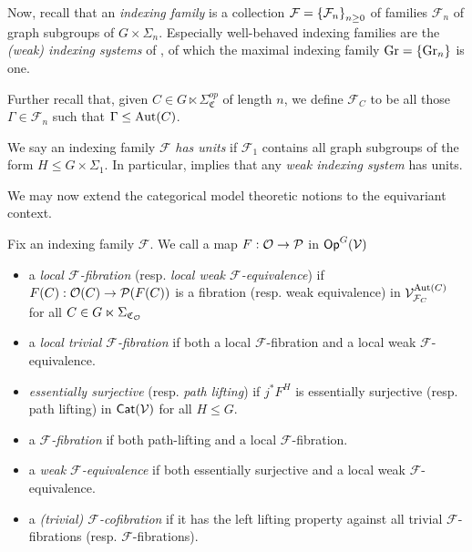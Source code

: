 \documentclass[a4paper,10pt
,draft
]{article}%
\renewcommand{\F}{\mathcal F}
\renewcommand{\1}{\eta}%
\newcommand{\SC}{\Sigma_{\mathfrak C}}
\begin{document}
Now, recall that an \textit{indexing family} is a collection $\F = \set{\F_n}_{n \geq 0}$ of families $\F_n$ of graph subgroups of $G \times \Sigma_n$.
Especially well-behaved indexing families are the \textit{(weak) indexing systems} of \cite{BP_geo},
of which the maximal indexing family $\mathrm{Gr} = \left\{\mathrm{Gr}_n\right\}$ is one.

Further recall that, given $C \in G \ltimes \SC^{op}$ of length $n$, we define $\F_C$ to be all those $\Gamma \in \F_n$ such that $\Gamma \leq \operatorname{Aut}(C)$.

\begin{definition}
      We say an indexing family $\F$ \textit{has units} if
      $\F_1$ contains all graph subgroups of the form $H \leq G \times \Sigma_1$.
      In particular, \cite[Remark 4.50]{BP_geo} implies that any \textit{weak indexing system} has units.
\end{definition}

We may now extend the categorical model theoretic notions to the equivariant context.
\begin{definition}
      \label{MODEL_DEFN}
      Fix an indexing family $\F$.
      We call a map $F: \mathcal{O} \to \mathcal{P}$ in $\mathsf{Op}^G(\mathcal V)$
      \begin{itemize}
      \item a {\em local $\F$-fibration} (resp. {\em local weak $\F$-equivalence}) if
            $F(C): \mathcal{O}(C)\to \mathcal{P}(F(C))$
            is a fibration (resp. weak equivalence) in $\V^{\Aut(C)}_{\F_C}$ for all $C \in G \ltimes \Sigma_{\mathfrak C_{\mathcal{O}}}$
      \item a {\em local trivial $\F$-fibration} if both a local $\F$-fibration and a local weak $\F$-equivalence.
      \item {\em essentially surjective} (resp. {\em path lifting}) if $j^*F^H$ is essentially surjective (resp. path lifting) in $\mathsf{Cat}(\mathcal V)$ for all $H\leq G$.
      \item a {\em $\F$-fibration} if both path-lifting and a local $\F$-fibration.
      \item a {\em weak $\F$-equivalence} if both essentially surjective and a local weak $\F$-equivalence.
      \item a \textit{(trivial) $\F$-cofibration} if it has the left lifting property against all trivial $\F$-fibrations (resp. $\F$-fibrations).
      \end{itemize}
\end{definition}
\end{document}
